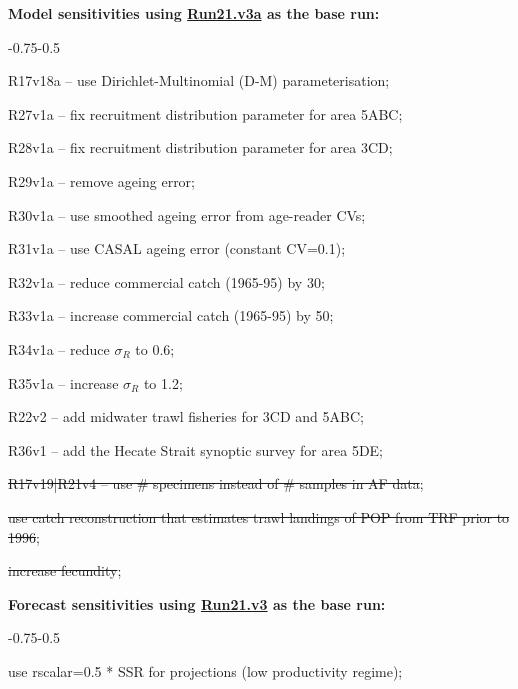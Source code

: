 \textbf{Model sensitivities using \hyperlink{R21}{Run21.v3a} as the base run:}
\begin{enumerate_csas}{-0.75}{-0.5}
	\item R17v18a -- use Dirichlet-Multinomial (D-M) parameterisation;
	\item R27v1a -- fix recruitment distribution parameter for area 5ABC;
	\item R28v1a -- fix recruitment distribution parameter for area 3CD;
	\item R29v1a -- remove ageing error;
	\item R30v1a -- use smoothed ageing error from age-reader CVs;
	\item R31v1a -- use CASAL ageing error (constant CV=0.1);
	\item R32v1a -- reduce commercial catch (1965-95) by 30\pc{};
	\item R33v1a -- increase commercial catch (1965-95) by 50\pc{};
	\item R34v1a -- reduce $\sigma_R$ to 0.6;
	\item R35v1a -- increase $\sigma_R$ to 1.2;
	\item R22v2 -- add midwater trawl fisheries for 3CD and 5ABC;
	\item R36v1 -- add the Hecate Strait synoptic survey for area 5DE;
	\item \st{R17v19|R21v4 -- use \# specimens instead of \# samples in AF data};  %
	\item \st{use catch reconstruction that estimates trawl landings of POP from TRF prior to 1996};
	\item \st{increase fecundity};
\end{enumerate_csas}

\textbf{Forecast sensitivities using \hyperlink{R21}{Run21.v3} as the base run:}
\begin{enumerate_csas}{-0.75}{-0.5}
	\item use rscalar=0.5 * SSR for projections (low productivity regime);
\end{enumerate_csas}

